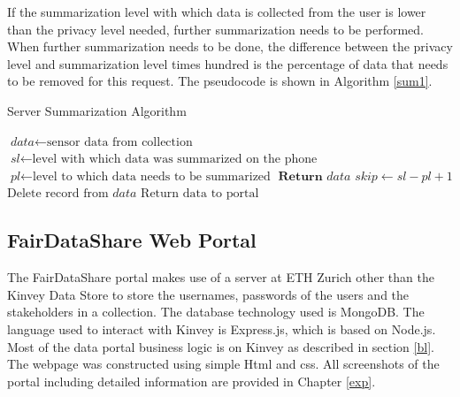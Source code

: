 If the summarization level with which data is collected from the user is lower than the privacy level needed, further summarization needs to be performed. When further summarization needs to be done, the difference between the privacy level and summarization level times hundred is the percentage of data that needs to be removed for this request. The pseudocode is shown in Algorithm \ref{sum1}.

\begin{algorithm}
\caption{Server Summarization Algorithm}\label{sum1}
\begin{algorithmic}[1]
\State $\textit{data} \gets \text{sensor data from collection}$
\State $\textit{sl} \gets \text{level with which data was summarized on the phone}$
\State $\textit{pl} \gets \text{level to which data needs to be summarized}$
	\State $\textbf{Return }\textit{data}$
\Else
	\State $\textit{skip} \gets \textit{sl}-\textit{pl}+1$
 	 \State $\text{Delete record from}\textit{ data}$
 	 \EndFor
\EndIf
\State $\text{Return data to portal}$
\EndProcedure
\end{algorithmic}
\end{algorithm}

\subsection{FairDataShare Web Portal}
The FairDataShare portal makes use of a server at ETH Zurich other than the Kinvey Data Store to store the usernames, passwords of the users and the stakeholders in a collection. The database technology used is MongoDB. The language used to interact with Kinvey is Express.js, which is based on Node.js. Most of the data portal business logic is on Kinvey as described in section \ref{bl}. The webpage was constructed using simple Html and css. All screenshots of the portal including detailed information are provided in Chapter \ref{exp}.









